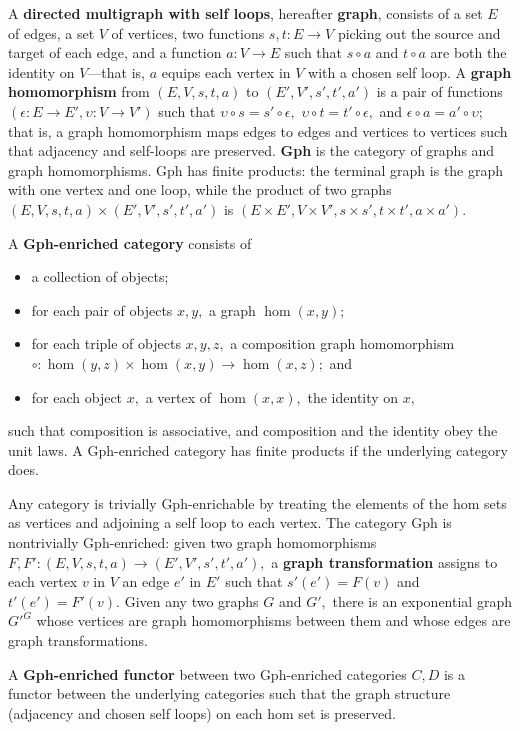 \documentclass[submission,copyright,creativecommons]{eptcs}
\newcommand{\maps}{\colon}
\begin{document}
A {\bf directed multigraph with self loops}, hereafter {\bf graph}, consists of a set $E$ of edges, a set $V$ of vertices, two functions $s,t\maps E \to V$ picking out the source and target of each edge, and a function $a\maps V \to E$ such that $s\circ a$ and $t \circ a$ are both the identity on $V$---that is, $a$ equips each vertex in $V$ with a chosen self loop.  A {\bf graph homomorphism} from $(E, V, s, t, a)$ to $(E', V', s', t', a')$ is a pair of functions $(\epsilon\maps E \to E', \upsilon\maps V \to V')$ such that $\upsilon\circ s = s' \circ \epsilon,$ $\upsilon\circ t = t' \circ \epsilon,$ and $\epsilon \circ a = a' \circ \upsilon;$ that is, a graph homomorphism maps edges to edges and vertices to vertices such that adjacency and self-loops are preserved.  {\bf Gph} is the category of graphs and graph homomorphisms.  Gph has finite products: the terminal graph is the graph with one vertex and one loop, while the product of two graphs $(E, V, s, t, a) \times (E', V', s', t', a')$ is $(E \times E', V \times V', s \times s', t\times t', a \times a').$

A {\bf Gph-enriched category} consists of
\begin{itemize}
  \item a collection of objects;
  \item for each pair of objects $x, y,$ a graph $\hom(x,y);$
  \item for each triple of objects $x, y, z,$ a composition graph homomorphism $\circ\maps \hom(y, z) \times \hom(x, y) \to \hom(x, z);$ and
  \item for each object $x,$ a vertex of $\hom(x, x),$ the identity on $x,$
\end{itemize}
such that composition is associative, and composition and the identity obey the unit laws.  A Gph-enriched category has finite products if the underlying category does.

Any category is trivially Gph-enrichable by treating the elements of the hom sets as vertices and adjoining a self loop to each vertex.  The category Gph is nontrivially Gph-enriched: given two graph homomorphisms $F, F'\maps (E, V, s, t, a) \to (E', V', s', t', a'),$ a {\bf graph transformation} assigns to each vertex $v$ in $V$ an edge $e'$ in $E'$ such that $s'(e') = F(v)$ and $t'(e') = F'(v).$  Given any two graphs $G$ and $G',$ there is an exponential graph $G'^G$ whose vertices are graph homomorphisms between them and whose edges are graph transformations.

A {\bf Gph-enriched functor} between two Gph-enriched categories $C, D$ is a functor between the underlying categories such that the graph structure (adjacency and chosen self loops) on each hom set is preserved.  
\end{document}

